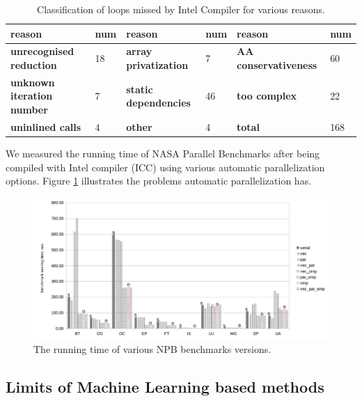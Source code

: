 \begin{table}
  \begin{minipage}{\pagewidth}
  \begin{center}
    \begin{tabu}{M{3.0cm}M{1.0cm}M{3.0cm}M{1.0cm}M{3.0cm}M{1.0cm}}
      \hline
      \rowfont{\bfseries}
      reason & num & reason & num & reason & num\\\hline
      \textbf{unrecognised reduction} & 18 & \textbf{array privatization} & 7 & \textbf{AA conservativeness} & 60\\\hline
      \textbf{unknown iteration number} & 7 & \textbf{static dependencies} & 46 & \textbf{too complex} & 22\\\hline
      \textbf{uninlined calls} & 4 & \textbf{other} & 4 & \textbf{total} & 168\\\hline
    \end{tabu}
  \end{center}
  \end{minipage}
  \caption{Classification of loops missed by Intel Compiler for various reasons.}
  \label{tab:icc_missed_opportunities}
\end{table}%

We measured the running time of NASA Parallel Benchmarks after being compiled with Intel compiler (ICC) using various automatic parallelization options. Figure \ref{fig:benchmarks_runtime} illustrates the problems automatic parallelization has.

\begin{figure}[ht]
\includegraphics[width=1.0\textwidth]{images/benchmark_runtime.pdf}
\caption{The running time of various NPB benchmarks versions.}
\label{fig:benchmarks_runtime}
\end{figure}

\subsection{Limits of Machine Learning based methods}
